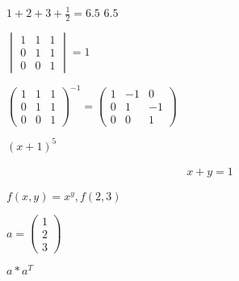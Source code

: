 $1+2+3+\frac{1}{2}=6.5$
$6.5$

$\begin{vmatrix}1&1&1\\0&1&1\\0&0&1\end{vmatrix}=1$

$\begin{pmatrix}1&1&1\\0&1&1\\0&0&1\end{pmatrix}^{-1}=\begin{pmatrix}
1 &-1 &0 \\
0 &1 &-1 \\
0 &0 &1
\end{pmatrix}$

$(x+1)^5$

\begin{align}
    x+y=1
\end{align}

$f(x,y)=x^y, f(2,3)$

$a=\begin{pmatrix}1\\2\\3\end{pmatrix}$

$a*a^T$


